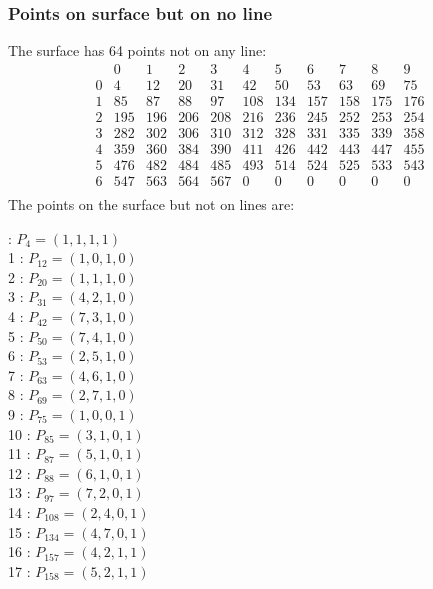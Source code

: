 \documentclass{article}
\begin{document}
{\subsubsection*{Points on surface but on no line}
The surface has 64 points not on any line:\\
$$
\begin{array}{r|*{10}{r}}
 & 0 & 1 & 2 & 3 & 4 & 5 & 6 & 7 & 8 & 9\\
\hline
0 & 4 & 12 & 20 & 31 & 42 & 50 & 53 & 63 & 69 & 75\\
1 & 85 & 87 & 88 & 97 & 108 & 134 & 157 & 158 & 175 & 176\\
2 & 195 & 196 & 206 & 208 & 216 & 236 & 245 & 252 & 253 & 254\\
3 & 282 & 302 & 306 & 310 & 312 & 328 & 331 & 335 & 339 & 358\\
4 & 359 & 360 & 384 & 390 & 411 & 426 & 442 & 443 & 447 & 455\\
5 & 476 & 482 & 484 & 485 & 493 & 514 & 524 & 525 & 533 & 543\\
6 & 547 & 563 & 564 & 567 & 0 & 0 & 0 & 0 & 0 & 0\\
\end{array}
$$
The points on the surface but not on lines are:\\
\begin{multicols}{2}
 : $P_{4}=( 1, 1, 1, 1 )$\\
1 : $P_{12}=( 1, 0, 1, 0 )$\\
2 : $P_{20}=( 1, 1, 1, 0 )$\\
3 : $P_{31}=( 4, 2, 1, 0 )$\\
4 : $P_{42}=( 7, 3, 1, 0 )$\\
5 : $P_{50}=( 7, 4, 1, 0 )$\\
6 : $P_{53}=( 2, 5, 1, 0 )$\\
7 : $P_{63}=( 4, 6, 1, 0 )$\\
8 : $P_{69}=( 2, 7, 1, 0 )$\\
9 : $P_{75}=( 1, 0, 0, 1 )$\\
10 : $P_{85}=( 3, 1, 0, 1 )$\\
11 : $P_{87}=( 5, 1, 0, 1 )$\\
12 : $P_{88}=( 6, 1, 0, 1 )$\\
13 : $P_{97}=( 7, 2, 0, 1 )$\\
14 : $P_{108}=( 2, 4, 0, 1 )$\\
15 : $P_{134}=( 4, 7, 0, 1 )$\\
16 : $P_{157}=( 4, 2, 1, 1 )$\\
17 : $P_{158}=( 5, 2, 1, 1 )$\\

\end{multicols}}
\end{document}
